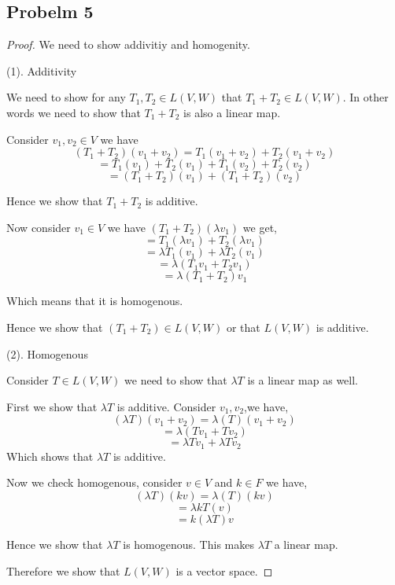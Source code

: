 \documentclass[a4paper]{report}
\begin{document}
\subsection*{Probelm 5}
\begin{proof}
We need to show addivitiy and homogenity.

(1). Additivity

We need to show for any $T_1, T_2 \in L(V,W)$  that $T_1 + T_2 \in L(V,W)$. In other words we need to show that $T_1 + T_2 $ is also a linear map.

Consider $v_1,v_2 \in V$ we have $$(T_1+T_2)(v_1+v_2) = T_1(v_1+v_2) + T_2(v_1 + v_2)$$
$$ = T_1(v_1) + T_2(v_1) + T_1(v_2) + T_2(v_2) $$ 
$$ = (T_1+T_2)(v_1) + (T_1+T_2)(v_2) $$ 

Hence we show that $T_1 + T_2$ is additive.

Now consider $v_1 \in V$ we have $(T_1+T_2)(\lambda v_1)$ we get, 
$$  = T_1(\lambda v_1) + T_2(\lambda v_1)  $$ 
$$ = \lambda T_1(v_1) + \lambda T_2(v_1) $$ 
$$ = \lambda (T_1v_1 + T_2v_1) $$ 
$$ = \lambda (T_1+T_2)v_1 $$ 

Which means that it is homogenous.

Hence we show that $(T_1+T_2) \in L(V,W)$ or that $L(V,W)$ is additive.

(2). Homogenous

Consider $T \in L(V,W)$ we  need to show that  $\lambda T$ is a linear map as well.

First we show that $\lambda T$ is additive. Consider $v_1,v_2$,we have, 
$$ (\lambda T) (v_1 + v_2) =\lambda (T)(v_1+v_2) $$ 
$$ = \lambda (Tv_1 + Tv_2) $$ 
$$ = \lambda Tv_1 + \lambda Tv_2 $$ 
Which shows that $\lambda T$ is additive.

Now we check homogenous, consider $v \in V$ and $k \in F$ we have,  
$$ (\lambda T)(kv) = \lambda (T)(kv) $$ 
$$ = \lambda k T(v) $$ 
$$ = k (\lambda T)v $$ 

Hence we show that $\lambda T$ is homogenous. This makes $\lambda T$ a linear map.

Therefore we show that  $L(V,W)$ is a vector space.



\end{proof}
\end{document}
